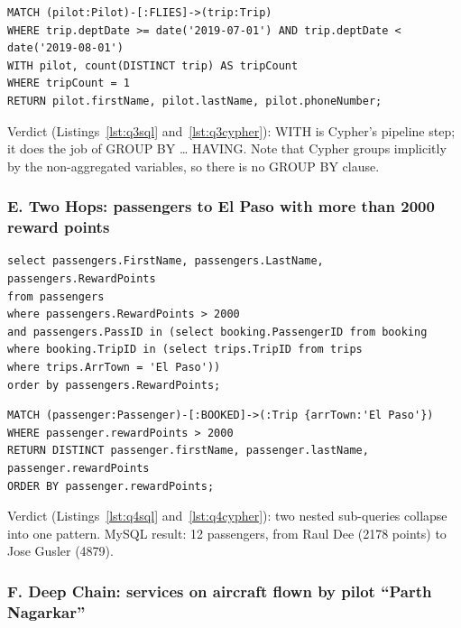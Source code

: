 \documentclass[11pt,a4paper]{article}
\begin{document}
\begin{lstlisting}[style=cyphercode,caption={The same query in Cypher, using WITH in place of GROUP BY and HAVING},label={lst:q3cypher}]
MATCH (pilot:Pilot)-[:FLIES]->(trip:Trip)
WHERE trip.deptDate >= date('2019-07-01') AND trip.deptDate < date('2019-08-01')
WITH pilot, count(DISTINCT trip) AS tripCount
WHERE tripCount = 1
RETURN pilot.firstName, pilot.lastName, pilot.phoneNumber;
\end{lstlisting}

Verdict (Listings~\ref{lst:q3sql} and~\ref{lst:q3cypher}): WITH is Cypher's pipeline step; it does the job of GROUP BY \ldots{} HAVING. Note that Cypher groups implicitly by the non-aggregated variables, so there is no GROUP BY clause.

\subsubsection*{E. Two Hops: passengers to El Paso with more than 2000 reward points}

\begin{lstlisting}[style=sqlcode,caption={Passengers to El Paso with more than 2000 reward points, in SQL},label={lst:q4sql}]
select passengers.FirstName, passengers.LastName, passengers.RewardPoints
from passengers
where passengers.RewardPoints > 2000
and passengers.PassID in (select booking.PassengerID from booking
where booking.TripID in (select trips.TripID from trips
where trips.ArrTown = 'El Paso'))
order by passengers.RewardPoints;
\end{lstlisting}

\begin{lstlisting}[style=cyphercode,caption={The same query in Cypher, two nested sub-queries collapsed into one pattern},label={lst:q4cypher}]
MATCH (passenger:Passenger)-[:BOOKED]->(:Trip {arrTown:'El Paso'})
WHERE passenger.rewardPoints > 2000
RETURN DISTINCT passenger.firstName, passenger.lastName, passenger.rewardPoints
ORDER BY passenger.rewardPoints;
\end{lstlisting}

Verdict (Listings~\ref{lst:q4sql} and~\ref{lst:q4cypher}): two nested sub-queries collapse into one pattern. MySQL result: 12 passengers, from Raul Dee (2178 points) to Jose Gusler (4879).

\subsubsection*{F. Deep Chain: services on aircraft flown by pilot ``Parth Nagarkar''}
\end{document}
